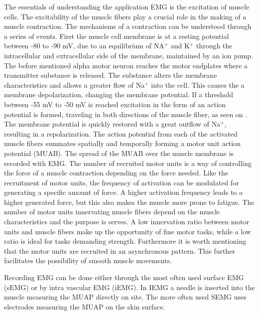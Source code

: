 The essentials of understanding the application EMG is the excitation of muscle cells. The excitability of the muscle fibers play a crucial role in the making of a muscle contraction. The mechanisms of a contraction can be understood through a series of events. First the muscle cell membrane is at a resting potential between -80 to -90 mV, due to an equilibrium of NA$^+$ and K$^+$ through the intracellular and extracellular side of the membrane, maintained by an ion pump. The before mentioned alpha motor neuron reaches the motor endplates where a transmitter substance is released. The substance alters the membrane characteristics and allows a greater flow of Na$^+$ into the cell. This causes the a membrane depolarization, changing the membrane potential. If a threshold between -55 mV to -50 mV is reached excitation in the form of an action potential is formed, traveling in both directions of the muscle fiber, as seen on . The membrane potential is quickly restored with a great outflow of Na$^+$, resulting in a repolarization. The action potential from each of the activated muscle fibers summates spatially and temporally forming a motor unit action potential (MUAB). The spread of the MUAB over the muscle membrane is recorded with EMG. The number of recruited motor units is a way of controlling the force of a muscle contraction depending on the force needed. Like the recruitment of motor units, the frequency of activation can be modulated for generating a specific amount of force. A higher activation frequency leads to a higher generated force, but this also makes the muscle more prone to fatigue. The number of motor units innervating muscle fibers depend on the muscle characteristics and the purpose is serves. A low innervation ratio between motor units and muscle fibers make up the opportunity of fine motor tasks, while a low ratio is ideal for tasks demanding strength. Furthermore it is worth mentioning that the motor units are recruited in an asynchronous pattern. This further facilitates the possibility of smooth muscle movements. \cite{Cram2012,Martini2012}       


Recording EMG can be done either through the most often used surface EMG (sEMG) or by intra vascular EMG (iEMG). In IEMG a needle is inserted into the muscle measuring the MUAP directly on site. The more often used SEMG uses electrodes measuring the MUAP on the skin surface.\cite{Cram2012} 




 
 



